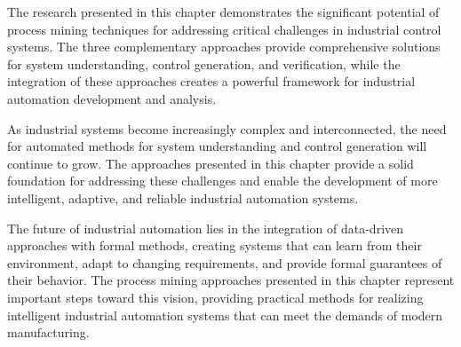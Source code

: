 The research presented in this chapter demonstrates the significant potential of process mining techniques for addressing critical challenges in industrial control systems. The three complementary approaches provide comprehensive solutions for system understanding, control generation, and verification, while the integration of these approaches creates a powerful framework for industrial automation development and analysis.

As industrial systems become increasingly complex and interconnected, the need for automated methods for system understanding and control generation will continue to grow. The approaches presented in this chapter provide a solid foundation for addressing these challenges and enable the development of more intelligent, adaptive, and reliable industrial automation systems.

The future of industrial automation lies in the integration of data-driven approaches with formal methods, creating systems that can learn from their environment, adapt to changing requirements, and provide formal guarantees of their behavior. The process mining approaches presented in this chapter represent important steps toward this vision, providing practical methods for realizing intelligent industrial automation systems that can meet the demands of modern manufacturing.
